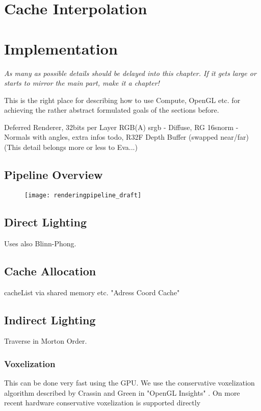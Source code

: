 \documentclass[thesis.tex]{subfiles}
\begin{document}
\section{Cache Interpolation}



\section{Implementation}

\emph{As many as possible details should be delayed into this chapter. If it gets large or starts to mirror the main part, make it a chapter!}

This is the right place for describing how to use Compute, OpenGL etc. for achieving the rather abstract formulated goals of the sections before.

Deferred Renderer, 32bits per Layer RGB(A) srgb - Diffuse, RG 16snorm - Normals with angles, extra infos todo, R32F Depth Buffer (swapped near/far)\\
(This detail belongs more or less to Eva...)

\subsection{Pipeline Overview}

\begin{figure}[h]
	\centering
	\texttt{[image: renderingpipeline\_draft]}
\end{figure}



\subsection{Direct Lighting}
Uses also Blinn-Phong.

\subsection{Cache Allocation} \label{sec:impl:cachealloc}
cacheList via shared memory etc.
"Adress Coord Cache"

\subsection{Indirect Lighting}

Traverse in Morton Order.

\subsubsection{Voxelization}
This can be done very fast using the GPU.
We use the conservative voxelization algorithm described by Crassin and Green in "OpenGL Insights" \cite{bib:openglinsightsvoxel}.
On more recent hardware conservative voxelization is supported directly

\subfilebib %
\end{document}
